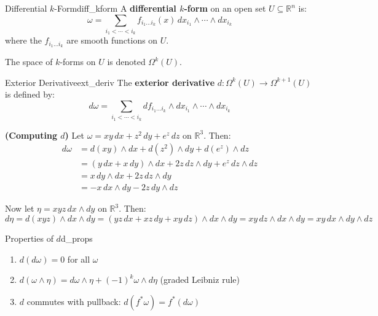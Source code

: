 \documentclass[11pt, letterpaper, openany]{book}
\begin{document}
\begin{defn}{Differential $k$-Form}{diff_kform}
A \textbf{differential $k$-form} on an open set $U \subseteq \mathbb{R}^n$ is:
\[
\omega = \sum_{i_1 < \cdots < i_k} f_{i_1 \ldots i_k}(x) \, dx_{i_1} \wedge \cdots \wedge dx_{i_k}
\]
where the $f_{i_1 \ldots i_k}$ are smooth functions on $U$.
\end{defn}

The space of $k$-forms on $U$ is denoted $\Omega^k(U)$.

\begin{defn}{Exterior Derivative}{ext_deriv}
The \textbf{exterior derivative} $d: \Omega^k(U) \to \Omega^{k+1}(U)$ is defined by:
\[
d\omega = \sum_{i_1 < \cdots < i_k} df_{i_1 \ldots i_k} \wedge dx_{i_1} \wedge \cdots \wedge dx_{i_k}
\]
\end{defn}

\begin{example}
\textbf{(Computing $d$)}
Let $\omega = xy\,dx + z^2\,dy + e^z\,dz$ on $\mathbb{R}^3$. Then:
\begin{align*}
d\omega &= d(xy) \wedge dx + d(z^2) \wedge dy + d(e^z) \wedge dz \\
&= (y\,dx + x\,dy) \wedge dx + 2z\,dz \wedge dy + e^z\,dz \wedge dz \\
&= x\,dy \wedge dx + 2z\,dz \wedge dy \\
&= -x\,dx \wedge dy - 2z\,dy \wedge dz
\end{align*}

Now let $\eta = xyz\,dx \wedge dy$ on $\mathbb{R}^3$. Then:
\[d\eta = d(xyz) \wedge dx \wedge dy = (yz\,dx + xz\,dy + xy\,dz) \wedge dx \wedge dy = xy\,dz \wedge dx \wedge dy = xy\,dx \wedge dy \wedge dz\]
\end{example}

\begin{thm}{Properties of $d$}{d_props}
\begin{enumerate}
    \item $d(d\omega) = 0$ for all $\omega$
    \item $d(\omega \wedge \eta) = d\omega \wedge \eta + (-1)^k \omega \wedge d\eta$ (graded Leibniz rule)
    \item $d$ commutes with pullback: $d(f^*\omega) = f^*(d\omega)$
\end{enumerate}
\end{thm}
\end{document}
